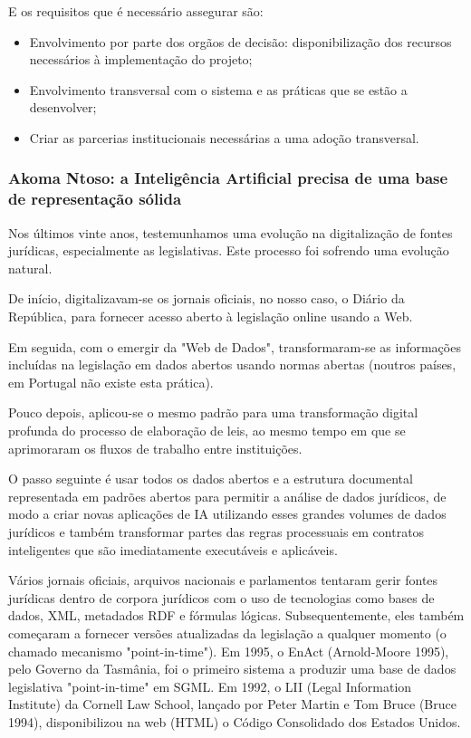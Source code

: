 E os requisitos que é necessário assegurar são:
\begin{itemize}
    \item Envolvimento por parte dos orgãos de decisão: disponibilização dos 
    recursos necessários à implementação do projeto;
    \item Envolvimento transversal com o sistema e as práticas que se estão a desenvolver;
    \item Criar as parcerias institucionais necessárias a uma adoção transversal.
\end{itemize}


\subsubsection{Akoma Ntoso: a Inteligência Artificial precisa de uma base de representação sólida}

Nos últimos vinte anos, testemunhamos uma evolução na digitalização de fontes 
jurídicas, especialmente as legislativas. Este processo foi sofrendo uma evolução
natural.

De início, digitalizavam-se os jornais oficiais, no nosso caso, o Diário da República, para fornecer acesso aberto à 
legislação online usando a Web. 

Em seguida, com o emergir da "Web de Dados", transformaram-se as informações incluídas na legislação em dados abertos usando 
normas abertas (noutros países, em Portugal não existe esta prática). 

Pouco depois, aplicou-se o mesmo padrão para uma transformação digital profunda do processo de elaboração de leis, 
ao mesmo tempo em que se aprimoraram os fluxos de trabalho entre instituições. 

O passo seguinte é usar todos os dados abertos e a estrutura documental representada em padrões abertos para permitir a 
análise de dados jurídicos, de modo a criar novas aplicações de IA utilizando esses grandes volumes de dados jurídicos e 
também transformar partes das regras processuais em contratos inteligentes que são imediatamente executáveis e aplicáveis.

Vários jornais oficiais, arquivos nacionais e parlamentos tentaram gerir fontes jurídicas dentro de corpora jurídicos com o uso 
de tecnologias como bases de dados, XML, metadados RDF e fórmulas lógicas. 
Subsequentemente, eles também começaram a fornecer versões atualizadas da legislação a qualquer momento 
(o chamado mecanismo "point-in-time"). 
Em 1995, o EnAct (Arnold-Moore 1995), pelo Governo da Tasmânia, foi o primeiro sistema a produzir uma base de dados legislativa 
"point-in-time" em SGML. 
Em 1992, o LII (Legal Information Institute) da Cornell Law School, lançado por Peter Martin e Tom Bruce (Bruce 1994), 
disponibilizou na web (HTML) o Código Consolidado dos Estados Unidos. 


